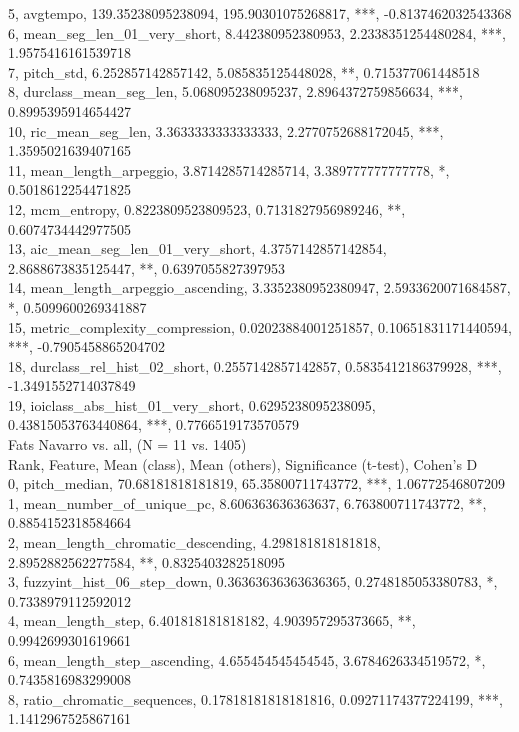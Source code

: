 5, avgtempo, 139.35238095238094, 195.90301075268817, ***, -0.8137462032543368\\
6, mean_seg_len_01_very_short, 8.442380952380953, 2.2338351254480284, ***, 1.9575416161539718\\
7, pitch_std, 6.252857142857142, 5.085835125448028, **, 0.715377061448518\\
8, durclass_mean_seg_len, 5.068095238095237, 2.8964372759856634, ***, 0.8995395914654427\\
10, ric_mean_seg_len, 3.3633333333333333, 2.2770752688172045, ***, 1.3595021639407165\\
11, mean_length_arpeggio, 3.8714285714285714, 3.389777777777778, *, 0.5018612254471825\\
12, mcm_entropy, 0.8223809523809523, 0.7131827956989246, **, 0.6074734442977505\\
13, aic_mean_seg_len_01_very_short, 4.3757142857142854, 2.8688673835125447, **, 0.6397055827397953\\
14, mean_length_arpeggio_ascending, 3.3352380952380947, 2.5933620071684587, *, 0.5099600269341887\\
15, metric_complexity_compression, 0.02023884001251857, 0.10651831171440594, ***, -0.7905458865204702\\
18, durclass_rel_hist_02_short, 0.2557142857142857, 0.5835412186379928, ***, -1.3491552714037849\\
19, ioiclass_abs_hist_01_very_short, 0.6295238095238095, 0.43815053763440864, ***, 0.7766519173570579\\
Fats Navarro vs. all, (N = 11 vs. 1405)\\
Rank, Feature, Mean (class), Mean (others), Significance (t-test), Cohen's D\\
0, pitch_median, 70.68181818181819, 65.35800711743772, ***, 1.06772546807209\\
1, mean_number_of_unique_pc, 8.606363636363637, 6.763800711743772, **, 0.8854152318584664\\
2, mean_length_chromatic_descending, 4.298181818181818, 2.8952882562277584, **, 0.8325403282518095\\
3, fuzzyint_hist_06_step_down, 0.36363636363636365, 0.2748185053380783, *, 0.7338979112592012\\
4, mean_length_step, 6.401818181818182, 4.903957295373665, **, 0.9942699301619661\\
6, mean_length_step_ascending, 4.655454545454545, 3.6784626334519572, *, 0.7435816983299008\\
8, ratio_chromatic_sequences, 0.17818181818181816, 0.09271174377224199, ***, 1.1412967525867161\\
